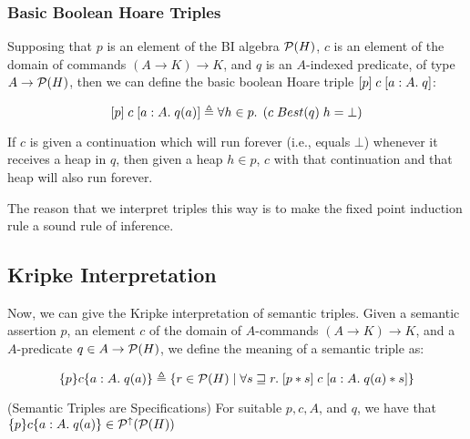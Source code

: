 \subsubsection{Basic Boolean Hoare Triples}

Supposing that $p$ is an element of the BI algebra $\mathcal{P}(H)$, $c$ is an element
of the domain of commands $(A \to K) \to K$, and $q$ is an $A$-indexed predicate, of
type $A \to \mathcal{P}(H)$, then we can define the basic boolean Hoare triple 
$[{p}]\;{c}\;[{a:A}.\;{q}]$:

\begin{displaymath}
  [{p}]\;{c}\;[{a:A}.\;{q(a)}] \triangleq
    \forall h \in p.\; \left(c\;Best(q)\;h = \bot\right)
\end{displaymath}

If $c$ is given a continuation which will run forever (i.e., equals
$\bot$) whenever it receives a heap in $q$, then given a heap $h \in
p$, $c$ with that continuation and that heap will also run forever.

The reason that we interpret triples this way is to make the fixed
point induction rule a sound rule of inference.



\subsection{Kripke Interpretation}

Now, we can give the Kripke interpretation of semantic triples. Given a semantic
assertion $p$, an element $c$ of the domain of $A$-commands $(A \to K) \to K$, 
and a $A$-predicate $q \in A \to \mathcal{P}(H)$, we define the meaning of a 
semantic triple as: 

\begin{displaymath}
  \{{p}\}{c}\{{a:A}.\;{q(a)}\} \triangleq
    \{{{ r \in \mathcal{P}(H) }\;|\;{\forall s \sqsupseteq r.\; [{p * s}]\;{c}\;[{a:A}.\;{q(a) * s}]}}\}
\end{displaymath}

\begin{lemma}{(Semantic Triples are Specifications)}
  For suitable $p,c,A$, and $q$, we have that 
$\{{p}\}{c}\{{a:A}.\;{q(a)}\} \in \mathcal{P}^{\uparrow}({\mathcal{P}(H)})$
\end{lemma}

